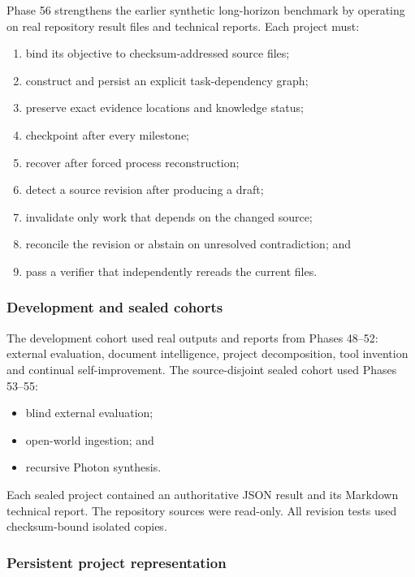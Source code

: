 Phase 56 strengthens the earlier synthetic long-horizon benchmark by
operating on real repository result files and technical reports.  Each
project must:
\begin{enumerate}
    \item bind its objective to checksum-addressed source files;
    \item construct and persist an explicit task-dependency graph;
    \item preserve exact evidence locations and knowledge status;
    \item checkpoint after every milestone;
    \item recover after forced process reconstruction;
    \item detect a source revision after producing a draft;
    \item invalidate only work that depends on the changed source;
    \item reconcile the revision or abstain on unresolved contradiction; and
    \item pass a verifier that independently rereads the current files.
\end{enumerate}

\subsubsection{Development and sealed cohorts}

The development cohort used real outputs and reports from Phases 48--52:
external evaluation, document intelligence, project decomposition, tool
invention and continual self-improvement.  The source-disjoint sealed cohort
used Phases 53--55:
\begin{itemize}
    \item blind external evaluation;
    \item open-world ingestion; and
    \item recursive Photon synthesis.
\end{itemize}

Each sealed project contained an authoritative JSON result and its Markdown
technical report.  The repository sources were read-only.  All revision
tests used checksum-bound isolated copies.

\subsubsection{Persistent project representation}

